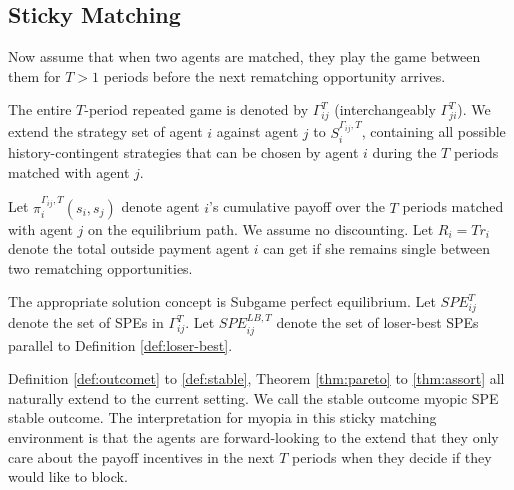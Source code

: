 \documentclass{myPaper}
\begin{document}
\subsection{Sticky Matching}
Now assume that when two agents are matched, they play the game between them for $T>1$ periods before the next rematching opportunity arrives. 

The entire $T$-period repeated game is denoted by \(\Gamma^T_{ij}\) (interchangeably \(\Gamma^T_{ji}\)). We extend the strategy set of agent $i$ against agent $j$ to $S_i^{\Gamma_{ij}, T}$, containing all possible history-contingent strategies that can be chosen by agent $i$ during the $T$ periods matched with agent $j$. 

Let $\pi_i^{\Gamma_{ij}, T}(s_i, s_j)$ denote agent $i$'s cumulative payoff over the $T$ periods matched with agent $j$ on the equilibrium path. We assume no discounting. Let $R_i=T r_i$ denote the total outside payment agent $i$ can get if she remains single between two rematching opportunities. 

The appropriate solution concept is Subgame perfect equilibrium. Let $SPE_{ij}^{T}$ denote the set of SPEs in \(\Gamma^T_{ij}\). Let $SPE_{ij}^{LB, T}$ denote the set of loser-best SPEs parallel to Definition \ref{def:loser-best}.

Definition \ref{def:outcomet} to \ref{def:stable}, Theorem \ref{thm:pareto} to \ref{thm:assort} all naturally extend to the current setting. We call the stable outcome myopic SPE stable outcome. The interpretation for myopia in this sticky matching environment is that the agents are forward-looking to the extend that they only care about the payoff incentives in the next $T$ periods when they decide if they would like to block. 
\end{document}
